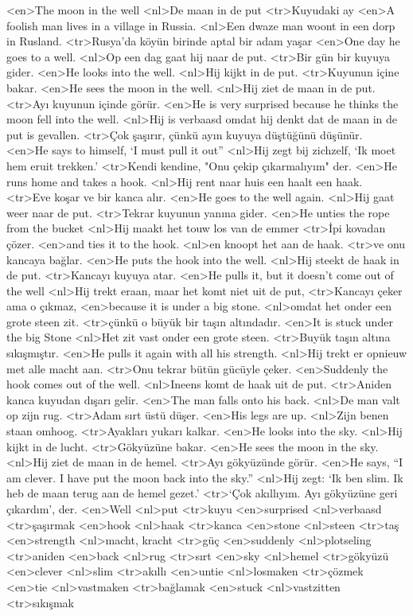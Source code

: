 <en>The moon in the well
<nl>De maan in de put
<tr>Kuyudaki ay
<en>A foolish man lives in a village in Russia.
<nl>Een dwaze man woont in een dorp in Rusland.
<tr>Rusya'da köyün birinde aptal bir adam yaşar
<en>One day he goes to a well.
<nl>Op een dag gaat hij naar de put.
<tr>Bir gün bir kuyuya gider.
<en>He looks into the well.
<nl>Hij kijkt in de put.
<tr>Kuyunun içine bakar.
<en>He sees the moon in the well.
<nl>Hij ziet de maan in de put.
<tr>Ayı kuyunun içinde görür.
<en>He is very surprised because he thinks the moon fell into the well.
<nl>Hij is verbaasd omdat hij denkt dat de maan in de put is gevallen.
<tr>Çok şaşırır, çünkü ayın kuyuya düştüğünü düşünür.
<en>He says to himself, `I must pull it out”
<nl>Hij zegt bij zichzelf, `Ik moet hem eruit trekken.'
<tr>Kendi kendine, "Onu çekip çıkarmalıyım" der.
<en>He runs home and takes a hook.
<nl>Hij rent naar huis een haalt een haak.
<tr>Eve koşar ve bir kanca alır.
<en>He goes to the well again.
<nl>Hij gaat weer naar de put.
<tr>Tekrar kuyunun yanına gider.
<en>He unties the rope from the bucket
<nl>Hij maakt het touw los van de emmer
<tr>İpi kovadan çözer.
<en>and ties it to the hook.
<nl>en knoopt het aan de haak. 
<tr>ve onu kancaya bağlar.
<en>He puts the hook into the well.
<nl>Hij steekt de haak in de put.
<tr>Kancayı kuyuya atar.
<en>He pulls it, but it doesn’t come out of the well
<nl>Hij trekt eraan, maar het komt niet uit de put,
<tr>Kancayı çeker ama o çıkmaz,
<en>because it is under a big stone.
<nl>omdat  het onder een grote steen zit.
<tr>çünkü o büyük bir taşın altındadır.
<en>It is stuck under the big Stone
<nl>Het zit vast onder een grote steen.
<tr>Buyük taşın altına sıkışmıştır.
<en>He pulls it again with all his strength.
<nl>Hij trekt er opnieuw met alle macht aan. 
<tr>Onu tekrar bütün gücüyle çeker.
<en>Suddenly the hook comes out of the well.
<nl>Ineens komt de haak uit de put.
<tr>Aniden kanca kuyudan dışarı gelir.
<en>The man falls onto his back.
<nl>De man valt op zijn rug.
<tr>Adam sırt üstü düşer.
<en>His legs are up.
<nl>Zijn benen staan omhoog. 
<tr>Ayakları yukarı kalkar.
<en>He looks into the sky.
<nl>Hij kijkt in de lucht.
<tr>Gökyüzüne bakar.
<en>He sees the moon in the sky.
<nl>Hij ziet de maan in de hemel.
<tr>Ayı gökyüzünde görür.
<en>He says, “I am clever. I have put the moon back into the sky.”
<nl>Hij zegt: `Ik ben slim. Ik heb de maan terug aan de hemel gezet.' 
<tr>`Çok akıllıyım. Ayı gökyüzüne geri çıkardım', der.
<en>Well
<nl>put
<tr>kuyu
<en>surprised
<nl>verbaasd
<tr>şaşırmak
<en>hook
<nl>haak
<tr>kanca
<en>stone
<nl>steen
<tr>taş
<en>strength
<nl>macht, kracht
<tr>güç
<en>suddenly
<nl>plotseling
<tr>aniden
<en>back
<nl>rug
<tr>sırt
<en>sky
<nl>hemel
<tr>gökyüzü
<en>clever
<nl>slim
<tr>akıllı
<en>untie
<nl>losmaken
<tr>çözmek
<en>tie
<nl>vastmaken
<tr>bağlamak
<en>stuck
<nl>vastzitten
<tr>sıkışmak
